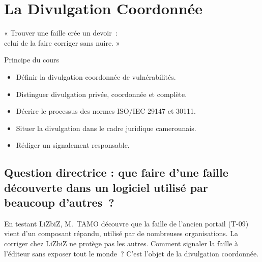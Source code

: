 
\chapter{La Divulgation Coordonnée}
\label{chap:divulgation}

\epigraph{%
    « Trouver une faille crée un devoir~:\\
    celui de la faire corriger sans nuire. »%
}{Principe du cours}


\begin{boxobjectifs}
\begin{itemize}
    \item Définir la divulgation coordonnée de vulnérabilités.
    \item Distinguer divulgation privée, coordonnée et complète.
    \item Décrire le processus des normes ISO/IEC 29147 et 30111.
    \item Situer la divulgation dans le cadre juridique camerounais.
    \item Rédiger un signalement responsable.
\end{itemize}
\end{boxobjectifs}

\bigskip

\section*{Question directrice : que faire d'une faille découverte dans un logiciel utilisé par beaucoup d'autres~?}

En testant LiZbiZ, M.~TAMO découvre que la faille de l'ancien portail (T-09)
vient d'un composant répandu, utilisé par de nombreuses organisations. La
corriger chez LiZbiZ ne protège pas les autres. Comment signaler la faille à
l'éditeur sans exposer tout le monde~? C'est l'objet de la divulgation
coordonnée.

